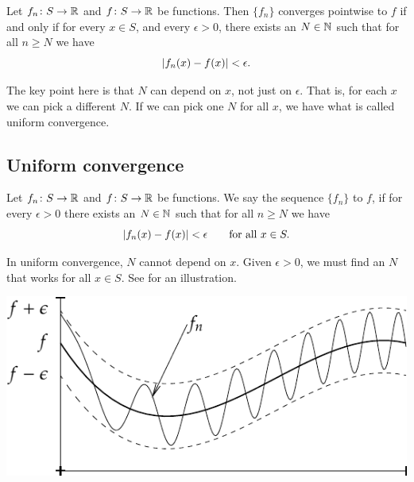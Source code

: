 \begin{prop} \label{ptwsconv:prop}
Let $f_n \colon S \to {\mathbb{R}}$ and $f \colon S \to {\mathbb{R}}$ be functions.
Then $\{ f_n \}$ converges pointwise to $f$ if and only if
for every $x \in S$, and every $\epsilon > 0$, there exists
an $N \in {\mathbb{N}}$ such that for all
$n \geq N$ we have
\begin{equation*}
\left\lvert {f_n(x)-f(x)} \right\rvert < \epsilon .
\end{equation*}
\end{prop}

The key point here is that $N$ can depend on $x$, not just on
$\epsilon$.  That is, for each $x$ we can pick a different $N$.
If we can pick one $N$ for all $x$, we have what is called
uniform convergence.

\subsection{Uniform convergence}

\begin{defn}
Let $f_n \colon S \to {\mathbb{R}}$
and $f \colon S \to {\mathbb{R}}$
be functions.  We say the sequence $\{ f_n \}$
\emph{} to $f$, if for
every $\epsilon > 0$ there exists an $N \in {\mathbb{N}}$ such that 
for all $n \geq N$ we have
\begin{equation*}
\left\lvert {f_n(x) - f(x)} \right\rvert < \epsilon \qquad \text{for all } x \in S.
\end{equation*}
\end{defn}

In uniform convergence, $N$ cannot depend on $x$.  Given $\epsilon > 0$,
we must find an $N$ that works for all $x \in S$.  See
 for an illustration.
\begin{myfigureht}
\includegraphics{figures/uniformconv}
\caption{In uniform convergence,
for $n \geq N$,
the functions $f_n$ are within a strip of $\pm\epsilon$ from $f$.%
\label{fig:uniformconv}}
\end{myfigureht}

